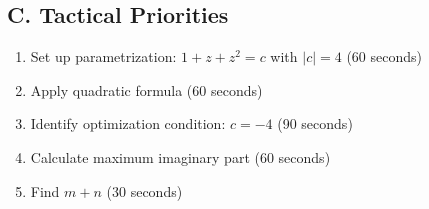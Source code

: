 \documentclass[11pt]{article}
\begin{document}
\begin{tacticalbox}
\subsection*{C. Tactical Priorities}
\begin{enumerate}[leftmargin=*]
    \item Set up parametrization: $1+z+z^2 = c$ with $|c| = 4$ (60 seconds)
    \item Apply quadratic formula (60 seconds)
    \item Identify optimization condition: $c = -4$ (90 seconds)
    \item Calculate maximum imaginary part (60 seconds)
    \item Find $m + n$ (30 seconds)
\end{enumerate}
\end{tacticalbox}
\end{document}
